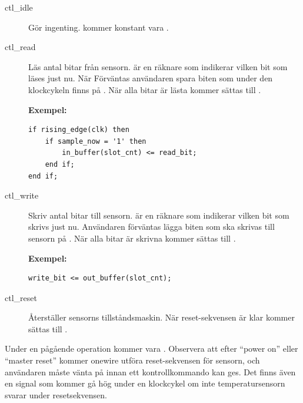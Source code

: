 \begin{description}
\item[ctl\_idle] Gör ingenting.  kommer konstant vara .

\item[ctl\_read] Läs  antal bitar från sensorn.  är en räknare som indikerar vilken bit som läses just nu. När  Förväntas användaren spara biten som under den klockcykeln finns på . När alla bitar är lästa kommer  sättas till .

\textbf{Exempel:}
\begin{lstlisting}
if rising_edge(clk) then
	if sample_now = '1' then
		in_buffer(slot_cnt) <= read_bit;
	end if;
end if;
\end{lstlisting}


\item[ctl\_write] Skriv  antal bitar till sensorn.  är en räknare som indikerar vilken bit som skrivs just nu. Användaren förväntas lägga biten som ska skrivas till sensorn på .
När alla bitar är skrivna kommer  sättas till .

\textbf{Exempel:}
\begin{lstlisting}
write_bit <= out_buffer(slot_cnt);
\end{lstlisting}

\item[ctl\_reset] Återställer sensorns tillståndsmaskin.
När reset-sekvensen är klar kommer  sättas till .


\end{description}
Under en pågående operation kommer  vara .
Observera att efter ``power on'' eller ``master reset'' kommer onewire utföra reset-sekvensen för sensorn, och användaren måste vänta på  innan ett kontrollkommando kan ges.
Det finns även en  signal som kommer gå hög under en klockcykel om inte temperatursensorn svarar under resetsekvensen.

